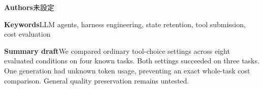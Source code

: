 \documentclass[uplatex,a4paper,twocolumn,10pt]{jsarticle}
\begin{document}
\noindent\textbf{Authors}\quad 未設定

\noindent\textbf{Keywords}\quad LLM agents, harness engineering, state retention, tool submission, cost evaluation

\noindent\textbf{Summary draft}\quad We compared ordinary tool-choice settings across eight evaluated conditions on four known tasks. Both settings succeeded on three tasks. One generation had unknown token usage, preventing an exact whole-task cost comparison. General quality preservation remains untested.
\end{document}
